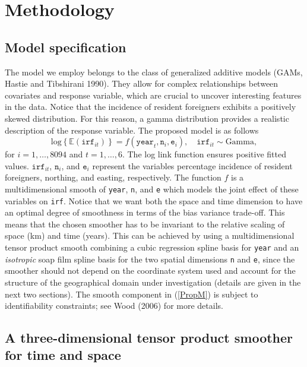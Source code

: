 \documentclass[10pt] {article}
\newcommand{\beq}{\begin{equation}}
\newcommand{\eeq}{\end{equation}}
\newcommand{\E}{\mathbb{E}}
\theoremstyle{definition}
\theoremstyle{plain}
\begin{document}
\section{Methodology \label{METH}}

\subsection{Model specification \label{MS}}

The model we employ belongs to the class of generalized additive models (GAMs, Hastie and Tibshirani 1990). They allow for  complex relationships between covariates and response variable, which are crucial to uncover interesting features in the data. Notice that the incidence of resident foreigners exhibits a positively skewed distribution. For this reason, a gamma distribution provides a realistic description of the response variable. The proposed model is as follows
\beq
\text{log}\left\{\E(\texttt{irf}_{it})\right\} = f(\texttt{year}_t,\texttt{n}_i,\texttt{e}_i), \quad \texttt{irf}_{it} \sim \text{Gamma},          
\label{PropM}
\eeq
for $i=1,\ldots,8094$ and $t=1,\ldots,6$. The log link function ensures positive fitted values. $\texttt{irf}_{it}$, $\texttt{n}_i$, and $\texttt{e}_i$ represent the variables percentage incidence of resident foreigners, northing, and easting, respectively. The function $f$ is a multidimensional smooth of \texttt{year}, \texttt{n}, and \texttt{e} which models the joint effect of these variables on \texttt{irf}. Notice that we want both the space and time dimension to have an optimal degree of smoothness in terms of the bias variance trade-off. This means that the chosen smoother has to be invariant to the relative scaling of space (km) and time (years). This can be achieved by using a multidimensional tensor product smooth combining a cubic regression spline basis for \texttt{year} and an \textit{isotropic} soap film spline basis for the two spatial dimensions \texttt{n} and \texttt{e}, since the smoother should not depend on the coordinate system used and account for the structure of the geographical domain under investigation (details are given in the next two sections). The smooth component in (\ref{PropM}) is subject to identifiability constraints; see Wood (2006) for more details.

\subsection{A three-dimensional tensor product smoother for time and space \label{3D}}
\end{document}
